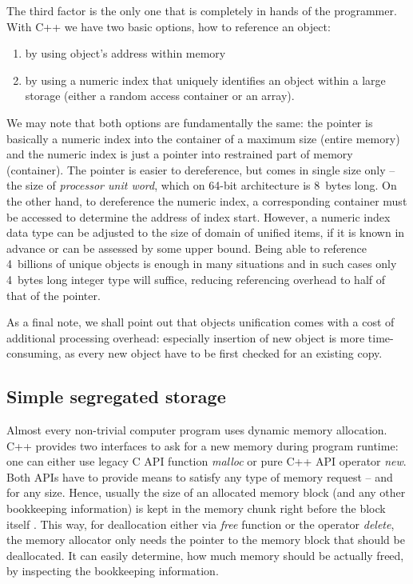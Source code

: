 The third factor is the only one that is completely in hands of the programmer.
With C++ we have two basic options, how to reference an object:
\begin{enumerate}
  \item by using object's address within memory
  \item by using a numeric index that uniquely identifies an object within a large storage
  (either a random access container or an array).
\end{enumerate}

We may note that both options are fundamentally the same:
the pointer is basically a numeric index into the container of a maximum size (entire memory)
and the numeric index is just a pointer into restrained part of memory (container).
The pointer is easier to dereference, but comes in single size only -- the size of
\emph{processor unit word}, which on 64-bit architecture is 8~bytes long.
On the other hand, to dereference the numeric index, a corresponding container must be
accessed to determine the address of index start.
However, a numeric index data type can be adjusted to the size of domain of unified items,
if it is known in advance or can be assessed by some upper bound.
Being able to reference 4~billions of unique objects is enough in many situations and
in such cases only 4~bytes long integer type will suffice, reducing referencing overhead
to half of that of the pointer.

As a final note, we shall point out that objects unification comes with a cost of
additional processing overhead: especially insertion of new object is more time-consuming,
as every new object have to be first checked for an existing copy.

\subsection{Simple segregated storage}

Almost every non-trivial computer program uses dynamic memory allocation.
C++ provides two interfaces to ask for a new memory during program runtime:
one can either use legacy C API function \emph{malloc} or pure C++ API operator \emph{new}.
Both APIs have to provide means to satisfy any type of memory request -- and for any size.
Hence, usually the size of an allocated memory block (and any other bookkeeping information) is
kept in the memory chunk right before the block itself \citep[Chapter 10]{meyers:effective-cpp}.
This way, for deallocation either via \emph{free} function or the operator \emph{delete},
the memory allocator only needs the pointer to the memory block that should be deallocated.
It can easily determine, how much memory should be actually freed, by inspecting the
bookkeeping information.

